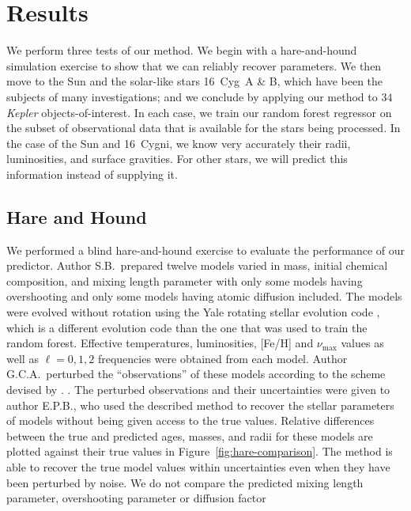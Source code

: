 \section{Results}
We perform three tests of our method. We begin with a hare-and-hound simulation exercise to show that we can reliably recover parameters. We then move to the Sun and the solar-like stars 16~Cyg~A \& B, which have been the subjects of many investigations; and we conclude by applying our method to $34$ \emph{Kepler} objects-of-interest. In each case, we train our random forest regressor on the subset of observational data that is available for the stars being processed. In the case of the Sun and 16~Cygni, we know very accurately their radii, luminosities, and surface gravities. For other stars, we will predict this information instead of supplying it. 


\subsection{Hare and Hound} 
\label{sec:hnh}
We performed a blind hare-and-hound exercise to evaluate the performance of our predictor. Author S.B.\ prepared twelve models varied in mass, initial chemical composition, and mixing length parameter with only some models having overshooting and only some models having atomic diffusion included. The models were evolved without rotation using the Yale rotating stellar evolution code \citep[YREC;][]{2008ApSS.316...31D}, which is a different evolution code than the one that was used to train the random forest. Effective temperatures, luminosities, [Fe/H] and $\nu_{\max}$ values as well as ${\ell=0},1,2$ frequencies were obtained from each model. Author G.C.A.\  perturbed the ``observations'' of these models according to the scheme devised by \citet{spaceinn}. . The perturbed observations and their uncertainties were given to author E.P.B.\@, who used the described method to recover the stellar parameters of  models without being given access to the true values. Relative differences between the true and predicted ages, masses, and radii for these models are plotted against their true values in Figure~\ref{fig:hare-comparison}. The method is able to recover the true model values within uncertainties even when they have been perturbed by noise. We do not compare the predicted mixing length parameter, overshooting parameter or diffusion  factor %

